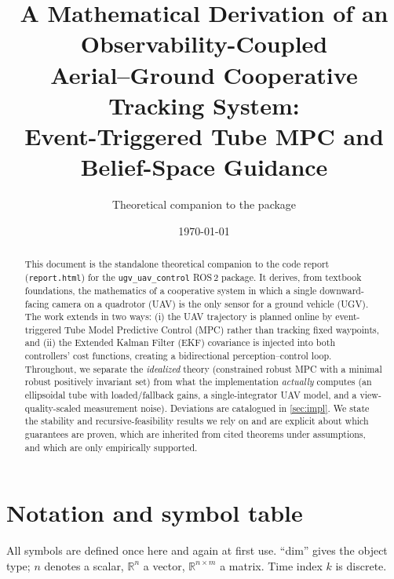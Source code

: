 \documentclass[11pt]{article}
\title{\textbf{A Mathematical Derivation of an Observability-Coupled\\
Aerial--Ground Cooperative Tracking System:\\ Event-Triggered Tube MPC and Belief-Space Guidance}}
\author{Theoretical companion to the \code{ugv\_uav\_control} package}
\date{\today}
\newcommand{\R}{\mathbb{R}}
\newcommand{\code}[1]{\texttt{#1}}
\begin{document}
\maketitle

\begin{abstract}
This document is the standalone theoretical companion to the code report (\code{report.html}) for the
\code{ugv\_uav\_control} ROS\,2 package. It derives, from textbook foundations, the mathematics of a
cooperative system in which a single downward-facing camera on a quadrotor (UAV) is the only sensor for a
ground vehicle (UGV). The work extends \citet{ferreira2024aerial} in two ways: (i) the UAV trajectory is
planned online by event-triggered Tube Model Predictive Control (MPC) rather than tracking fixed waypoints,
and (ii) the Extended Kalman Filter (EKF) covariance is injected into both controllers' cost functions,
creating a bidirectional perception--control loop. Throughout, we separate the \emph{idealized} theory
(constrained robust MPC with a minimal robust positively invariant set) from what the implementation
\emph{actually} computes (an ellipsoidal tube with loaded/fallback gains, a single-integrator UAV model,
and a view-quality-scaled measurement noise). Deviations are catalogued in \cref{sec:impl}. We state the
stability and recursive-feasibility results we rely on and are explicit about which guarantees are proven,
which are inherited from cited theorems under assumptions, and which are only empirically supported.
\end{abstract}

\tableofcontents

\section{Notation and symbol table}
\label{sec:notation}

All symbols are defined once here and again at first use. ``dim'' gives the object type;
$n$ denotes a scalar, $\R^n$ a vector, $\R^{n\times m}$ a matrix. Time index $k$ is discrete.
\end{document}
